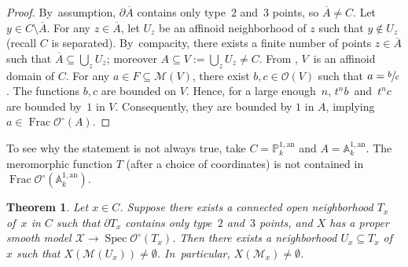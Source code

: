\documentclass[10pt]{amsart}
\DeclareMathOperator{\Frac}{Frac}
\DeclareMathOperator{\Spec}{Spec}
\let\backslash\setminus
\newtheorem{thm}{Theorem}[section]
\theoremstyle{definition}
\begin{document}
\begin{proof}
By~assumption, $\partial{\overline{A}}$ contains only type~$2$ and~3 points, so $\overline{A} \neq C$. Let $y \in C \backslash \overline{A}$. For any $z \in \overline{A}$, let $U_z$ be an affinoid neighborhood of $z$ such that $y \not\in U_z$ (recall $C$ is separated). By~compacity, there exists a finite number of points $z \in \overline{A}$ such that $\overline{A} \subseteq \bigcup_{z} U_z$; moreover $A \subseteq V:=\bigcup_{z} U_z \neq C$. From \cite[Th.\,1.8.15(2)]{doktoratura}, $V$~is an affinoid domain of $C$. For any $a \in F \subseteq \mathscr{M}(V)$, there exist $b, c \in \mathcal{O}(V)$ such that $a=\sfrac{b}{c}$. The functions $b,c$ are bounded on $V$. Hence, for a large enough~$n$, $t^nb$~and~$t^nc$ are bounded by~$1$ in $V$. Consequently, they are bounded by $1$ in $A$, implying $a \in \Frac \mathcal{O}^{\circ}(A)$.
\end{proof}

To see why the statement is not always true, take $C=\mathbb{P}_k^{1, \mathrm{an}}$ and $A=\mathbb{A}_k^{1, \mathrm{an}}$. The meromorphic function $T$ (after a choice of coordinates) is not contained in $\Frac \mathcal{O}^{\circ}(\mathbb{A}_k^{1, \mathrm{an}})$.

\begin{thm} \label{1.5}
Let $x\in C$. Suppose there exists a connected open neighborhood $T_x$ of~$x$ in $C$ such that $\partial{T_x}$ contains only type~$2$ and~$3$ points, and $X$ has a proper smooth model ${\mathcal{X} \to \Spec \mathcal{O}^{\circ}(T_x)}$. Then there exists a neighborhood $U_x \subseteq T_x$ of $x$ such that ${X(\mathscr{M}(U_x)) \neq \emptyset}$. In~particular, $X(\mathscr{M}_x) \neq \emptyset$.
\end{thm}
\end{document}
